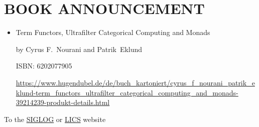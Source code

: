 \documentclass{article}
\begin{document}
\begin{itemize}
\end{itemize}\section{BOOK ANNOUNCEMENT}\label{BOOKANNOUNCEMENT}\begin{itemize}\item  Term Functors, Ultrafilter Categorical Computing and Monads 
 
  by Cyrus F. Nourani and Patrik Eklund 
 
  ISBN: 6202077905  
 
  \href{https://www.hugendubel.de/de/buch_kartoniert/cyrus_f_nourani_patrik_eklund-term_functors_ultrafilter_categorical_computing_and_monads-39214239-produkt-details.html}{https://www.hugendubel.de/de/buch\_kartoniert/cyrus\_f\_nourani\_patrik\_eklund-term\_functors\_ultrafilter\_categorical\_computing\_and\_monads-39214239-produkt-details.html} 
 
\end{itemize}


To the \href{http://siglog.org/}{SIGLOG} or \href{https://lics.siglog.org}{LICS} website
\end{document}
